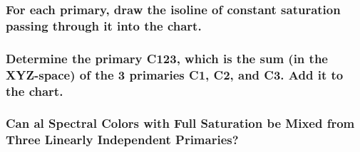 \documentclass{article}
\begin{document}
\subsubsection*{For each primary, draw the isoline of constant saturation passing through it into the chart.}

\subsubsection*{Determine the primary C123, which is the sum (in the XYZ-space) of the 3 primaries C1, C2, and C3. Add it to the chart.}

\subsubsection*{Can al Spectral Colors with Full Saturation be Mixed from Three Linearly Independent Primaries?}
\end{document}
